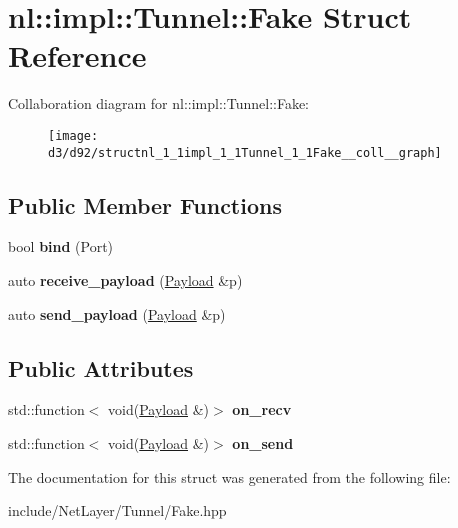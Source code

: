 \hypertarget{structnl_1_1impl_1_1Tunnel_1_1Fake}{}\section{nl\+:\+:impl\+:\+:Tunnel\+:\+:Fake Struct Reference}
\label{structnl_1_1impl_1_1Tunnel_1_1Fake}


Collaboration diagram for nl\+:\+:impl\+:\+:Tunnel\+:\+:Fake\+:\nopagebreak
\begin{figure}[H]
\begin{center}
\leavevmode
\texttt{[image: d3/d92/structnl\_1\_1impl\_1\_1Tunnel\_1\_1Fake\_\_coll\_\_graph]}
\end{center}
\end{figure}
\subsection*{Public Member Functions}
\begin{DoxyCompactItemize}
\item 
\hypertarget{structnl_1_1impl_1_1Tunnel_1_1Fake_a3e463ac8462d8cd4fabc669a68c0aab0}{}bool {\bfseries bind} (Port)\label{structnl_1_1impl_1_1Tunnel_1_1Fake_a3e463ac8462d8cd4fabc669a68c0aab0}

\item 
\hypertarget{structnl_1_1impl_1_1Tunnel_1_1Fake_a86ecf7e0ea1c99b7ed926a5c057661d1}{}auto {\bfseries receive\+\_\+payload} (\hyperlink{structnl_1_1Payload}{Payload} \&p)\label{structnl_1_1impl_1_1Tunnel_1_1Fake_a86ecf7e0ea1c99b7ed926a5c057661d1}

\item 
\hypertarget{structnl_1_1impl_1_1Tunnel_1_1Fake_a2c6f5a3406a0c13b5ed86306130af8bc}{}auto {\bfseries send\+\_\+payload} (\hyperlink{structnl_1_1Payload}{Payload} \&p)\label{structnl_1_1impl_1_1Tunnel_1_1Fake_a2c6f5a3406a0c13b5ed86306130af8bc}

\end{DoxyCompactItemize}
\subsection*{Public Attributes}
\begin{DoxyCompactItemize}
\item 
\hypertarget{structnl_1_1impl_1_1Tunnel_1_1Fake_a804a29756a339f3b65f33988b5f5cf40}{}std\+::function$<$ void(\hyperlink{structnl_1_1Payload}{Payload} \&)$>$ {\bfseries on\+\_\+recv}\label{structnl_1_1impl_1_1Tunnel_1_1Fake_a804a29756a339f3b65f33988b5f5cf40}

\item 
\hypertarget{structnl_1_1impl_1_1Tunnel_1_1Fake_a271b065b4864c762ee029881e8acccb4}{}std\+::function$<$ void(\hyperlink{structnl_1_1Payload}{Payload} \&)$>$ {\bfseries on\+\_\+send}\label{structnl_1_1impl_1_1Tunnel_1_1Fake_a271b065b4864c762ee029881e8acccb4}

\end{DoxyCompactItemize}


The documentation for this struct was generated from the following file\+:\begin{DoxyCompactItemize}
\item 
include/\+Net\+Layer/\+Tunnel/Fake.\+hpp\end{DoxyCompactItemize}

